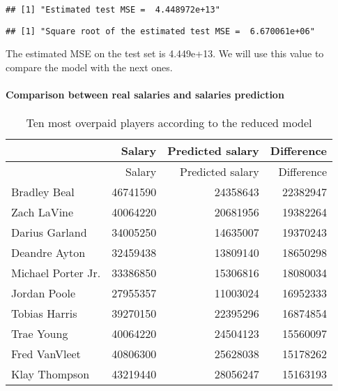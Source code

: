 \documentclass[
]{article}
\begin{document}
\begin{verbatim}
## [1] "Estimated test MSE =  4.448972e+13"
\end{verbatim}

\begin{verbatim}
## [1] "Square root of the estimated test MSE =  6.670061e+06"
\end{verbatim}

The estimated MSE on the test set is 4.449e+13. We will use this value
to compare the model with the next ones.

\hypertarget{comparison-between-real-salaries-and-salaries-prediction}{%
\paragraph{Comparison between real salaries and salaries
prediction}\label{comparison-between-real-salaries-and-salaries-prediction}}

\begin{longtable}[]{@{}lrrr@{}}
\caption{Ten most overpaid players according to the reduced
model}\tabularnewline
\toprule()
& Salary & Predicted salary & Difference \\
\midrule()
\endfirsthead
\toprule()
& Salary & Predicted salary & Difference \\
\midrule()
\endhead
Bradley Beal & 46741590 & 24358643 & 22382947 \\
Zach LaVine & 40064220 & 20681956 & 19382264 \\
Darius Garland & 34005250 & 14635007 & 19370243 \\
Deandre Ayton & 32459438 & 13809140 & 18650298 \\
Michael Porter Jr. & 33386850 & 15306816 & 18080034 \\
Jordan Poole & 27955357 & 11003024 & 16952333 \\
Tobias Harris & 39270150 & 22395296 & 16874854 \\
Trae Young & 40064220 & 24504123 & 15560097 \\
Fred VanVleet & 40806300 & 25628038 & 15178262 \\
Klay Thompson & 43219440 & 28056247 & 15163193 \\
\bottomrule()
\end{longtable}
\end{document}
